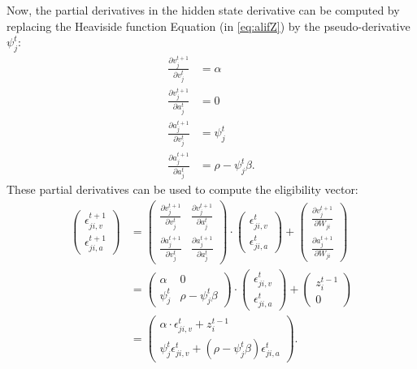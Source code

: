             Now, the partial derivatives in the hidden state derivative can be computed by replacing the Heaviside function Equation (in \ref{eq:alifZ}) by the pseudo-derivative $\psi^t_j$:
            \begin{align}
            \frac{\partial v_j^{t+1}}{\partial v_j^t} &= \alpha\\
            \frac{\partial v_j^{t+1}}{\partial a_j^t} &= 0\\
            \frac{\partial a_j^{t+1}}{\partial v_j^t} &= \psi^t_j\\
            \frac{\partial a_j^{t+1}}{\partial a_j^t} &= \rho - \psi^t_j\beta.
            \end{align}
            These partial derivatives can be used to compute the eligibility vector:
            \begin{align}
            \begin{pmatrix}
            \epsilon_{ji, v}^{t+1}\\
            \epsilon_{ji, a}^{t+1}
            \end{pmatrix}
            &=
            \begin{pmatrix}
            \frac{\partial v^{t+1}_j}{\partial v^t_j} & \frac{\partial v^{t+1}_j}{\partial a^t_j}\\
            \frac{\partial a^{t+1}_j}{\partial v^t_j} & \frac{\partial a^{t+1}_j}{\partial a^t_j}
            \end{pmatrix}
            \cdot
            \begin{pmatrix}
            \epsilon_{ji, v}^t\\
            \epsilon_{ji, a}^t
            \end{pmatrix}
            +
            \begin{pmatrix}
            \frac{\partial v^{t+1}_j}{\partial W_{ji}}\\
            \frac{\partial a^{t+1}_j}{\partial W_{ji}}
            \end{pmatrix}\\
            &=
            \begin{pmatrix}
            \alpha & 0\\
            \psi^t_j & \rho-\psi^t_j\beta
            \end{pmatrix}
            \cdot
            \begin{pmatrix}
            \epsilon_{ji, v}^t\\
            \epsilon_{ji, a}^t
            \end{pmatrix}
            +
            \begin{pmatrix}
            z_i^{t-1}\\
            0
            \end{pmatrix}\label{eq:evector_b}\\
            &=
            \begin{pmatrix}
            \alpha \cdot\epsilon_{ji, v}^t + z_i^{t-1}\\
            \psi^t_j\epsilon^t_{ji, v} + \left(\rho-\psi^t_j\beta\right)\epsilon^t_{ji, a}
            \end{pmatrix}.
            \end{align}

